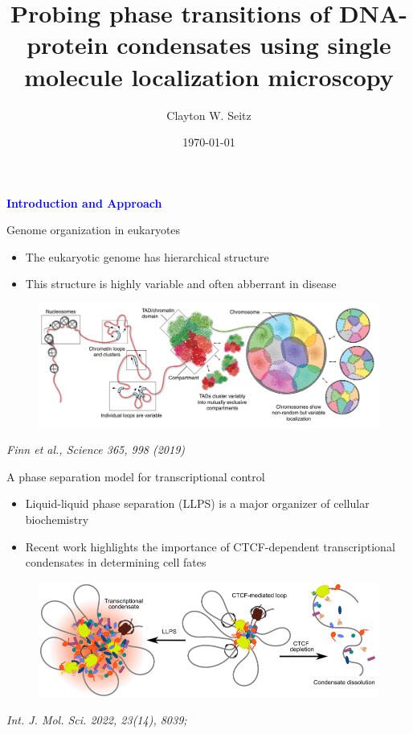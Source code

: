 \documentclass{beamer}					%
\title{Probing phase transitions of DNA-protein condensates using single molecule localization microscopy}	%
\author{Clayton W. Seitz}								%
\date{\today}									%
\begin{document}
\begin{frame}
  \titlepage
\end{frame}


%


\begin{frame}
\frametitle{}
\centering
\Large \textbf{\textcolor{blue}{Introduction and Approach}}
\end{frame}


\begin{frame}{Genome organization in eukaryotes}
\begin{itemize}
\item The eukaryotic genome has hierarchical structure
\item This structure is highly variable and often abberrant in disease
\end{itemize}
\begin{figure}
\includegraphics[width=13cm]{Genome.png}
\end{figure}
\textit{Finn et al., Science 365, 998 (2019)}
\end{frame}

\begin{frame}{A phase separation model for transcriptional control}
\begin{itemize}
\item Liquid-liquid phase separation (LLPS) is a major organizer of cellular biochemistry
\item Recent work highlights the importance of CTCF-dependent transcriptional condensates in determining cell fates
\end{itemize}
\begin{figure}
\includegraphics[width=13cm]{Condensates.png}
\end{figure}
\textit{Int. J. Mol. Sci. 2022, 23(14), 8039;}
\end{frame}
\end{document}
